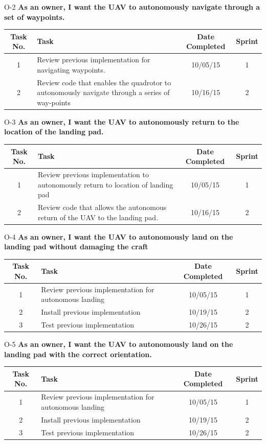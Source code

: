 \documentclass[11pt]{beamer}
\begin{document}
\begin{frame}{O-2}
\textbf{As an owner, I want the UAV to autonomously navigate through a set of waypoints.}
\begin{tabular}{| c | >{\raggedright}m{4cm} | c | c |}\hline
Task No. & Task & Date Completed & Sprint\\\hline
1 & Review previous implementation for navigating waypoints. & 10/05/15 & 1 \\\hline
2 & Review code that enables the quadrotor to autonomously navigate through a series of way-points & 10/16/15 & 2 \\\hline

\end{tabular}
\end{frame}


\begin{frame}{O-3}
\textbf{As an owner, I want the UAV to autonomously return to the location of the landing pad.}
\begin{tabular}{| c | >{\raggedright}m{4cm} | c | c |}\hline
Task No. & Task & Date Completed & Sprint\\\hline
1 & Review previous implementation to autonomously return to location of landing pad & 10/05/15 & 1 \\\hline
2 & Review code that allows the autonomous return of the UAV to the landing pad. & 10/16/15 & 2 \\\hline

\end{tabular}
\end{frame}


\begin{frame}{O-4}
\textbf{As an owner, I want the UAV to autonomously land on the landing pad without damaging the craft}
\begin{tabular}{| c | >{\raggedright}m{4cm} | c | c |}\hline
Task No. & Task & Date Completed & Sprint\\\hline
1 & Review previous implementation for autonomous landing & 10/05/15 & 1 \\\hline
2 & Install previous implementation & 10/19/15 & 2 \\\hline
3 & Test previous implementation & 10/26/15 & 2\\\hline

\end{tabular}
\end{frame}


\begin{frame}{O-5}
\textbf{As an owner, I want the UAV to autonomously land on the landing pad with the correct orientation.}
\begin{tabular}{| c | >{\raggedright}m{4cm} | c | c |}\hline
Task No. & Task & Date Completed & Sprint\\\hline
1 & Review previous implementation for autonomous landing & 10/05/15 & 1 \\\hline
2 & Install previous implementation & 10/19/15 & 2 \\\hline
3 & Test previous implementation & 10/26/15 & 2\\\hline
\end{tabular}
\end{frame}
\end{document}
